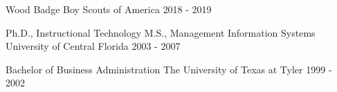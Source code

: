 


\begin{cventries}


\cventry
{Wood Badge} %
{Boy Scouts of America}
{} %
    {2018 - 2019} %
{ %
}

\cventry
{Ph.D., Instructional Technology \newline {\vspace{-.75mm}}
M.S., Management Information Systems}  %
{University of Central Florida}
{} %
    {2003 - 2007} %
{ %
}

\cventry
{Bachelor of Business Administration} %
{The University of Texas at Tyler}
{} %
    {1999 - 2002} %
{ %
}


\end{cventries}
